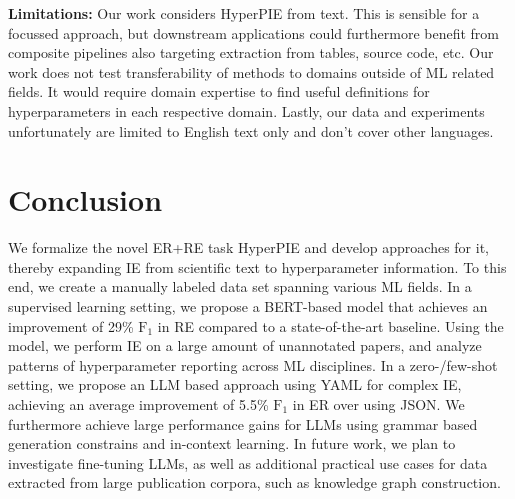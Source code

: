 \textbf{Limitations:} Our work considers HyperPIE from text. This is sensible for a focussed approach, but downstream applications could furthermore benefit from composite pipelines also targeting extraction from tables, source code, etc.
Our work does not test transferability of methods to domains outside of ML related fields. It would require domain expertise to find useful definitions for hyperparameters in each respective domain.
Lastly, our data and 
experiments unfortunately are limited to English text only and don't cover other languages.







\section{Conclusion}\label{sec:hyper-conclusion}


We formalize the novel ER+RE task HyperPIE and develop approaches for it, thereby expanding IE from scientific text to hyperparameter information. To this end, we create a manually labeled data set spanning various ML fields. In a supervised learning setting, we propose a BERT-based model that achieves an improvement of 29\% $\text{F}_1$ in RE compared to a state-of-the-art baseline. Using the model, we perform IE on a large amount of unannotated papers, and analyze patterns of hyperparameter reporting across ML disciplines. In a zero-/few-shot setting, we propose an LLM based approach using YAML for complex IE, achieving an average improvement of 5.5\% $\text{F}_1$ in ER over using JSON. We furthermore achieve large performance gains for LLMs using grammar based generation constrains and in-context learning. In future work, we plan to investigate fine-tuning LLMs, as well as additional practical use cases for data extracted from large publication corpora, such as knowledge graph construction.

